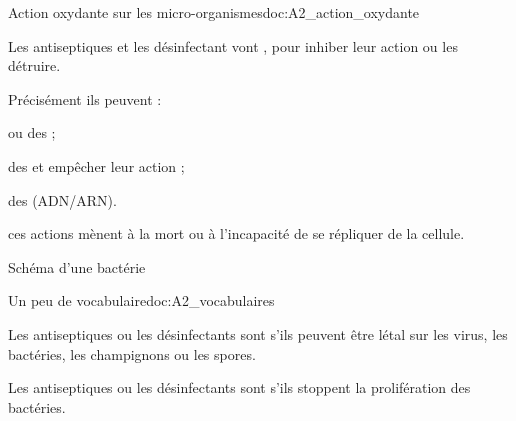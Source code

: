 \begin{doc}{Action oxydante sur les micro-organismes}{doc:A2_action_oxydante}
  \begin{encart}  
    Les antiseptiques et les désinfectant vont , pour inhiber leur action ou les détruire.
  \end{encart}

  Précisément ils peuvent :
  \begin{listePoints}
    \item {} ou  des  ;
    \item {} des  et empêcher leur action ;
    \item {} des  (ADN/ARN).
  \end{listePoints}
  ces actions mènent à la mort ou à l'incapacité de se répliquer de la cellule.
  \begin{center}

    Schéma d'une bactérie
  \end{center}
\end{doc}





\begin{doc}{Un peu de vocabulaire}{doc:A2_vocabulaires}
  \begin{encart}
    Les antiseptiques ou les désinfectants sont  s'ils peuvent être létal sur les virus, les bactéries, les champignons ou les spores.
  \end{encart}

  \begin{encart}
    Les antiseptiques ou les désinfectants sont  s'ils stoppent la prolifération des bactéries.
  \end{encart}
\end{doc}


